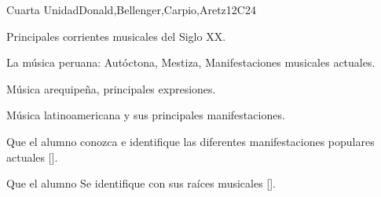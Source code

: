 \begin{syllabus}
\begin{unit}{}{Cuarta Unidad}{Donald,Bellenger,Carpio,Aretz}{12}{C24}
\begin{topics}
	\item Principales corrientes musicales del Siglo XX.
	\item La música peruana: Autóctona, Mestiza, Manifestaciones musicales actuales.
	\item Música arequipeña, principales expresiones.
	\item Música latinoamericana y sus principales manifestaciones.
\end{topics}
\begin{learningoutcomes}
	\item Que el alumno conozca e identifique las diferentes manifestaciones populares actuales [\Usage].
	\item Que el alumno Se identifique con sus raíces musicales [\Usage].
\end{learningoutcomes}
\end{unit}



\begin{coursebibliography}
\end{coursebibliography}

\end{syllabus}
